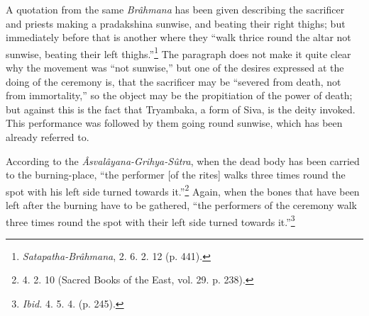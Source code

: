 \documentclass[a4paper, 11pt, oneside, polutonikogreek, english]{article}
\begin{document}
A quotation from the same \emph{Brâhmana} has been given describing the sacrificer and priests making a pradakshina sunwise, and beating their right thighs; but immediately before that is another where they ``walk thrice round the altar not sunwise, beating their left thighs.''\footnote{\emph{Satapatha-Brâhmana}, 2. 6. 2. 12 (p. 441).} The paragraph does not make it quite clear why the movement was ``not sunwise,'' but one of the desires expressed at the doing of the ceremony is, that the sacrificer may be ``severed from death, not from immortality,'' so the object may be the propitiation of the power of death; but against this is the fact that Tryambaka, a form of Siva, is the deity invoked. This performance was followed by them going round sunwise, which has been already referred to.

According to the \emph{Âsvalâyana-Grihya-Sûtra}, when the dead body has been carried to the burning-place, ``the performer [of the rites] walks three times round the spot with his left side turned towards it.''\footnote{4. 2. 10 (Sacred Books of the East, vol. 29. p. 238).} Again, when the bones that have been left after the burning have to be gathered, ``the performers of the ceremony walk three times round the spot with their left side turned towards it.''\footnote{\emph{Ibid.} 4. 5. 4. (p. 245).}
\end{document}
